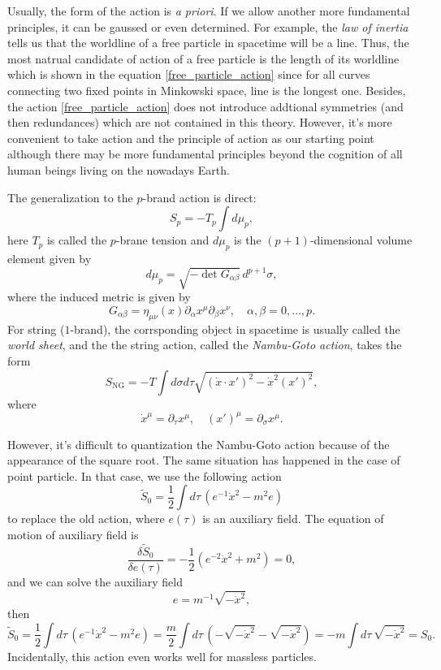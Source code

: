 Usually, the form of the action is \textit{a priori}. If we
allow another more fundamental principles, it can be gaussed
or even determined. For example, the \textit{law of inertia}
tells us that the worldline of a free particle in spacetime
will be a line. Thus, the most natrual candidate of action 
of a free particle is the length of its worldline which is 
shown in the equation \eqref{free_particle_action} since
for all curves connecting two fixed points in Minkowski space,
line is the longest one. Besides, the action 
\eqref{free_particle_action} does not introduce addtional
symmetries (and then redundances) which are not contained in 
this theory. However, it's more convenient to take action 
and the principle of action as our starting point although
there may be more fundamental principles beyond the cognition
of all human beings living on the nowadays Earth.

The generalization to the $p$-brand action is direct:
\[
	S_p=-T_p\int d\mu_p,
\]
here $T_p$ is called the $p$-brane tension and $d\mu_p$ is 
the $(p+1)$-dimensional volume element given by
\[
	d\mu_p=\sqrt{-\det G_{\alpha\beta}}\,d^{p+1}\sigma,
\]
where the induced metric is given by
\[
	G_{\alpha\beta}=\eta_{\mu\nu}(x)\partial_\alpha x^\mu 
	\partial_\beta x^\nu,\quad \alpha,\beta=0,\dots,p.
\]
For string ($1$-brand), the corrsponding object in spacetime 
is usually called the \textit{world sheet}, and the the 
string action, called the \textit{Nambu-Goto action}, takes
the form
\[
	S_{\text{NG}}=-T\int d\sigma d\tau \sqrt{(\dot x\cdot x')^2-\dot x^2 (x')^2},
\]
where 
\[
	\dot x^\mu=\partial_\tau x^\mu,\quad (x')^\mu=\partial_\sigma x^\mu.
\]

However, it's difficult to quantization the Nambu-Goto action 
because of the appearance of the square root. The same situation
has happened in the case of point particle. In that case, we use the 
following action
\[
	\tilde S_0=\frac{1}{2} \int d\tau\, (e^{-1}\dot x^2-m^2 e)
\]
to replace the old action, where $e(\tau)$ is an auxiliary field.
The equation of motion of auxiliary field is 
\[
	\frac{\delta \tilde S_0}{\delta e(\tau)}=
	-\frac{1}{2}(e^{-2}\dot x^2+m^2)=0,
\]
and we can solve the auxiliary field
\[
	e=m^{-1}\sqrt{-\dot x^2},
\]
then
\[
	\tilde S_0=\frac{1}{2} \int d\tau\, (e^{-1}\dot x^2-m^2 e)
	=\frac{m}{2}\int d\tau\, (-\sqrt{-\dot x^2}-\sqrt{-\dot x^2})
	=-m\int d\tau\, \sqrt{-\dot x^2}=S_0.
\]
Incidentally, this action even works well for massless particles.

